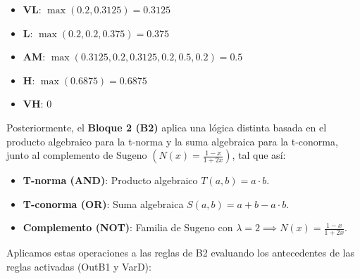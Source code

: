 \documentclass[11pt, a4paper]{article}
\newenvironment{problem}[1][Cuestión]{
	\vspace{0.5cm}
	\noindent{\Large\bfseries #1} \par\vspace{0.5cm}
}{
	\vspace{0.5cm}
}
\begin{document}
\begin{problem}[Problema 2 (60 \%)]
{				\begin{itemize}
					\item \textbf{VL}: $\max(0.2, 0.3125) = 0.3125$
					\item \textbf{L}: $\max(0.2, 0.2, 0.375) = 0.375$
					\item \textbf{AM}: $\max(0.3125, 0.2, 0.3125, 0.2, 0.5, 0.2) = 0.5$
					\item \textbf{H}: $\max(0.6875) = 0.6875$
					\item \textbf{VH}: $0$
				\end{itemize}

				Posteriormente, el \textbf{Bloque 2 (B2)} aplica una lógica distinta basada en el producto algebraico para la t-norma y la suma algebraica para la t-conorma, junto al complemento de Sugeno $\left ( N(x) = \frac{1-x}{1+2x} \right )$, tal que así:

				\begin{itemize}
					\item \textbf{T-norma (AND)}: Producto algebraico $T(a,b) = a \cdot b$.
					\item \textbf{T-conorma (OR)}: Suma algebraica $S(a,b) = a + b - a \cdot b$.
					\item \textbf{Complemento (NOT)}: Familia de Sugeno con $\lambda = 2 \implies N(x) = \frac{1-x}{1+2x}$.
				\end{itemize}

				Aplicamos estas operaciones a las reglas de B2 evaluando los antecedentes de las reglas activadas (OutB1 y VarD):

}
\end{problem}
\end{document}
